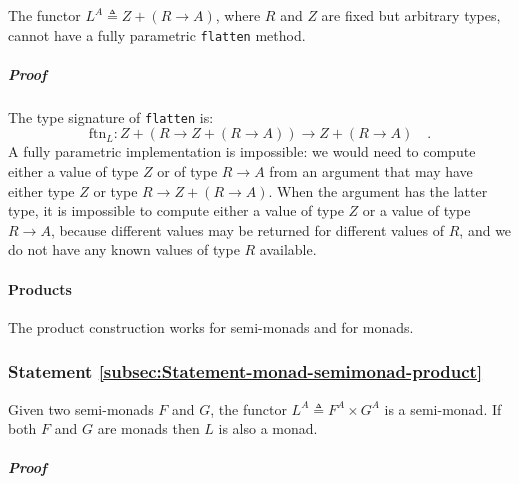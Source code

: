 The functor $L^{A}\triangleq Z+\left(R\rightarrow A\right)$, where
$R$ and $Z$ are fixed but arbitrary types, cannot have a fully parametric
\lstinline!flatten! method.

\subparagraph{Proof}

The type signature of \lstinline!flatten! is:
\[
\text{ftn}_{L}:Z+\left(R\rightarrow Z+\left(R\rightarrow A\right)\right)\rightarrow Z+\left(R\rightarrow A\right)\quad.
\]
A fully parametric implementation is impossible: we would need to
compute either a value of type $Z$ or of type $R\rightarrow A$ from
an argument that may have either type $Z$ or type $R\rightarrow Z+\left(R\rightarrow A\right)$.
When the argument has the latter type, it is impossible to compute
either a value of type $Z$ or a value of type $R\rightarrow A$,
because different values may be returned for different values of $R$,
and we do not have any known values of type $R$ available. 

\paragraph{Products}

The product construction works for semi-monads and for monads.

\subsubsection{Statement \label{subsec:Statement-monad-semimonad-product}\ref{subsec:Statement-monad-semimonad-product}}

Given two semi-monads $F$ and $G$, the functor $L^{A}\triangleq F^{A}\times G^{A}$
is a semi-monad. If both $F$ and $G$ are monads then $L$ is also
a monad.

\subparagraph{Proof}

